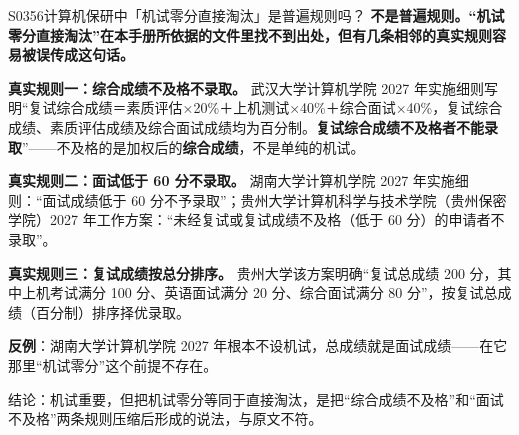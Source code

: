 \begin{qa}{S0356}{计算机保研中「机试零分直接淘汰」是普遍规则吗？}
\textbf{不是普遍规则。“机试零分直接淘汰”在本手册所依据的文件里找不到出处，但有几条相邻的真实规则容易被误传成这句话。}

\textbf{真实规则一：综合成绩不及格不录取。} 武汉大学计算机学院 2027 年实施细则写明“复试综合成绩＝素质评估×20\%＋上机测试×40\%＋综合面试×40\%，复试综合成绩、素质评估成绩及综合面试成绩均为百分制。\textbf{复试综合成绩不及格者不能录取}”——不及格的是加权后的\textbf{综合成绩}，不是单纯的机试。

\textbf{真实规则二：面试低于 60 分不录取。} 湖南大学计算机学院 2027 年实施细则：“面试成绩低于 60 分不予录取”；贵州大学计算机科学与技术学院（贵州保密学院）2027 年工作方案：“未经复试或复试成绩不及格（低于 60 分）的申请者不录取”。

\textbf{真实规则三：复试成绩按总分排序。} 贵州大学该方案明确“复试总成绩 200 分，其中上机考试满分 100 分、英语面试满分 20 分、综合面试满分 80 分”，按复试总成绩（百分制）排序择优录取。

\textbf{反例}：湖南大学计算机学院 2027 年根本不设机试，总成绩就是面试成绩——在它那里“机试零分”这个前提不存在。

结论：机试重要，但把机试零分等同于直接淘汰，是把“综合成绩不及格”和“面试不及格”两条规则压缩后形成的说法，与原文不符。
\end{qa}

